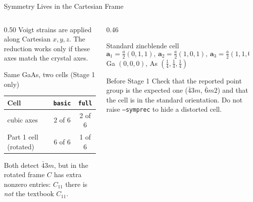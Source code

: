 \documentclass[8pt]{beamer}
\begin{document}
\begin{frame}{Symmetry Lives in the Cartesian Frame}
	\begin{columns}[T]
		\begin{column}{0.50\textwidth}
			Voigt strains are applied along Cartesian $x,y,z$.
			The reduction works only if these axes match the crystal axes.
			\par\vspace{0.2cm}
			\begin{block}{Same GaAs, two cells (Stage 1 only)}
				\centering\small
				\begin{tabular}{lcc}
					\toprule
					Cell & \texttt{basic} & \texttt{full} \\
					\midrule
					cubic axes & 2 of 6 & 2 of 6 \\
					Part 1 cell (rotated) & 6 of 6 & 1 of 6 \\
					\bottomrule
				\end{tabular}
			\end{block}
			{\small Both detect $\bar{4}3m$, but in the rotated frame $C$ has extra
			nonzero entries: $C_{11}$ there is \emph{not} the textbook $C_{11}$.}
		\end{column}
		\begin{column}{0.46\textwidth}
			\begin{block}{Standard zincblende cell}
				\small
				\[
					\mathbf{a}_1 = \tfrac{a}{2}(0,1,1),\
					\mathbf{a}_2 = \tfrac{a}{2}(1,0,1),\
					\mathbf{a}_3 = \tfrac{a}{2}(1,1,0)
				\]
				Ga $(0,0,0)$, As $(\tfrac14,\tfrac14,\tfrac14)$
			\end{block}
			\begin{alertblock}{Before Stage 1}
				Check that the reported point group is the expected one
				($\bar{4}3m$, $\bar{6}m2$) and that the cell is in the standard orientation.
				Do not raise \texttt{--symprec} to hide a distorted cell.
			\end{alertblock}
		\end{column}
	\end{columns}
\end{frame}
\end{document}

